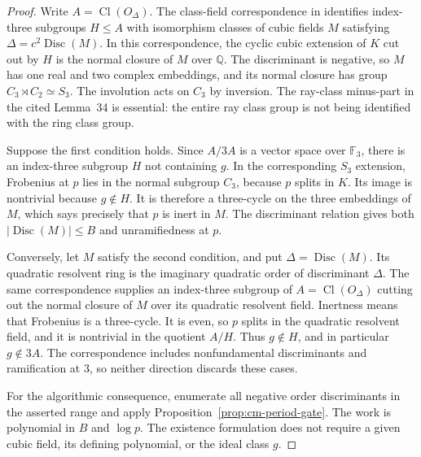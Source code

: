 \documentclass[11pt]{article}
\theoremstyle{definition}
\theoremstyle{remark}
\begin{document}
\begin{proof}
Write $A=\operatorname{Cl}(O_\Delta)$.
The class-field correspondence in
\cite[\S5.1, Lemma~34 and Proposition~35, pp.~256--258]
{BhargavaVarma2016}
identifies index-three subgroups $H\le A$ with isomorphism
classes of cubic fields $M$ satisfying
$\Delta=c^2\operatorname{Disc}(M)$.
In this correspondence, the cyclic cubic extension of $K$
cut out by $H$ is the normal closure of $M$ over $\mathbb Q$.
The discriminant is negative, so $M$ has one real and two complex
embeddings, and its normal closure has group
$C_3\rtimes C_2\simeq S_3$.
The involution acts on $C_3$ by inversion.
The ray-class minus-part in the cited Lemma~34 is essential:
the entire ray class group is not being identified with the ring
class group.

Suppose the first condition holds.
Since $A/3A$ is a vector space over $\mathbb F_3$, there is an
index-three subgroup $H$ not containing $g$.
In the corresponding $S_3$ extension, Frobenius at $p$ lies in
the normal subgroup $C_3$, because $p$ splits in $K$.
Its image is nontrivial because $g\notin H$.
It is therefore a three-cycle on the three embeddings of $M$,
which says precisely that $p$ is inert in $M$.
The discriminant relation gives both
$|\operatorname{Disc}(M)|\le B$ and unramifiedness at $p$.

Conversely, let $M$ satisfy the second condition, and put
$\Delta=\operatorname{Disc}(M)$.
Its quadratic resolvent ring is the imaginary quadratic order of
discriminant $\Delta$.
The same correspondence supplies an index-three subgroup of
$A=\operatorname{Cl}(O_\Delta)$ cutting out the normal closure
of $M$ over its quadratic resolvent field.
Inertness means that Frobenius is a three-cycle.
It is even, so $p$ splits in the quadratic resolvent field, and
it is nontrivial in the quotient $A/H$.
Thus $g\notin H$, and in particular $g\notin3A$.
The correspondence includes nonfundamental discriminants and
ramification at $3$, so neither direction discards these cases.

For the algorithmic consequence, enumerate all negative order
discriminants in the asserted range and apply
Proposition~\ref{prop:cm-period-gate}.
The work is polynomial in $B$ and $\log p$.
The existence formulation does not require a given cubic field,
its defining polynomial, or the ideal class $g$.
\end{proof}
\end{document}
